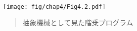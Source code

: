 \begin{figure}[tb]
\label{Figure 4.2}
\centering
\begin{comment}
\heading{Figure 4.2:} The factorial program, viewed as an abstract machine.

\begin{example}
    +-----------------------------------+
    | factorial                   |1    |
    |              |1             V     |
    |              |           +-----+  |
    |              V           | #   |  |
    |           +-----+        |     |  |
6 --------*-----|  =  |------->|   #-+-----> 720
    |     |     +-----+        |  /  |  |
    |     |                    | #   |  |
    |     |                    +-----+  |
    |     |                       ^     |
    |     |                       |     |
    |     |                    +--+--+  |
    |     *------------------->|  *  |  |
    |     |                    +-----+  |
    |     V                       ^     |
    |  +-----+    +-----------+   |     |
    |  |  -  +--->| factorial +---+     |
    |  +-----+    +-----------+         |
    |     ^                             |
    |     |1                            |
    +-----------------------------------+
\end{example}
\end{comment}
\texttt{[image: fig/chap4/Fig4.2.pdf]}
\begin{quote}
 抽象機械として見た階乗プログラム
\end{quote}
\end{figure}

